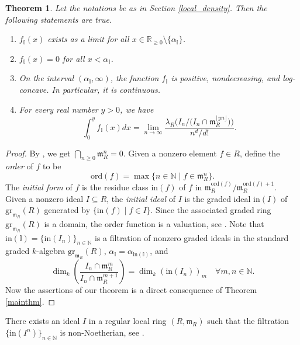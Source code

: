 \documentclass[12pt,a4paper]{amsart}
\theoremstyle{plain}
\newtheorem{theorem}{Theorem}[section]
\theoremstyle{definition}
\numberwithin{equation}{theorem}
\newcommand{\mm}{\mathfrak{m}}
\newcommand{\NN}{\mathbb{N}}
\begin{document}
\begin{theorem}
 Let the notations be as in Section \ref{local_density}. Then the following statements are true.
 \begin{enumerate}[$(i)$]
  \item $f_{\mathbb{I}}(x)$ exists as a limit for all $x\in \mathbb{R}_{\geq 0}\setminus\{\alpha_{\mathbb{I}}\}$.
  \item $f_{\mathbb{I}}(x) = 0$ for all $x<\alpha_{\mathbb{I}}$.
  \item On the interval $(\alpha_{\mathbb{I}},\infty)$, the function $f_{\mathbb{I}}$ is positive, nondecreasing, and log-concave. In particular, it is continuous.
  \item For every real number $y>0$, we have $$\int_{0}^y f_{\mathbb{I}}(x) dx = \lim_{n\to\infty}\dfrac{\lambda_R\big(I_n/\big(I_n\cap \mm_R^{\lfloor yn\rfloor}\big)\big)}{n^d/d!}.$$
 \end{enumerate}
\end{theorem}
\begin{proof}
By \cite[Corollary 10.19]{AM69}, we get $\bigcap_{n\geq 0}\mm_R^n = 0$. Given a nonzero element $f\in R$, define the \emph{order} of $f$ to be $$\mathrm{ord}(f) = \max\{n\in\NN \mid f\in \mm_R^n\}.$$ The \emph{initial form} of $f$ is the residue class $\mathrm{in}(f)$ of $f$ in $\mm_R^{\mathrm{ord}(f)}/\mm_R^{\mathrm{ord}(f)+1}$. Given a nonzero ideal $I\subseteq R$, the \emph{initial ideal} of $I$ is the graded ideal $\mathrm{in}(I)$ of $\mathrm{gr}_{\mm_R}(R)$ generated by $\{\mathrm{in}(f)\mid f\in I\}$. Since the associated graded ring $\mathrm{gr}_{\mm_R}(R)$ is a domain, the order function is a valuation, see \cite[Chapter VIII, Theorem 1]{ZS60}. Note that $\mathrm{in}(\mathbb{I}) = \{\mathrm{in}(I_n)\}_{n\in\mathbb{N}}$ is a filtration of nonzero graded ideals in the standard graded $k$-algebra $\mathrm{gr}_{\mm_R}(R)$, $\alpha_{\mathbb{I}} = \alpha_{\mathrm{in}(\mathbb{I})}$, and $$\dim_k \left(\frac{I_n \cap \mm_R^m}{I_n \cap \mm_R^{m+1}}\right) = \dim_k {\left(\mathrm{in}(I_n)\right)}_m \quad \forall m,n\in\NN.$$ Now the assertions of our theorem is a direct consequence of Theorem \ref{mainthm}.
\end{proof}

There exists an ideal $I$ in a regular local ring $(R,\mm_R)$ such that the filtration $\{\mathrm{in}(I^n)\}_{n\in\mathbb{N}}$ is non-Noetherian, see \cite[Example 3.4]{CHS10}.
\end{document}
